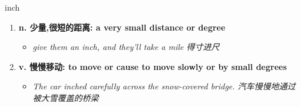 
\begin{frame}
{\huge inch}
\begin{center}
\begin{enumerate}\Large
  \item \textbf{n. 少量,很短的距离: a very small distance or degree}
  \begin{itemize}
    \item \em{\Large{give them an inch, and they'll take a mile 得寸进尺}}
  \end{itemize}
  \item \textbf{v. 慢慢移动: to move or cause to move slowly or by small degrees}
  \begin{itemize}
    \item \em{\Large{The car inched carefully across the snow-covered bridge. 汽车慢慢地通过被大雪覆盖的桥梁}}
  \end{itemize}
\end{enumerate}
\end{center}
\end{frame}
